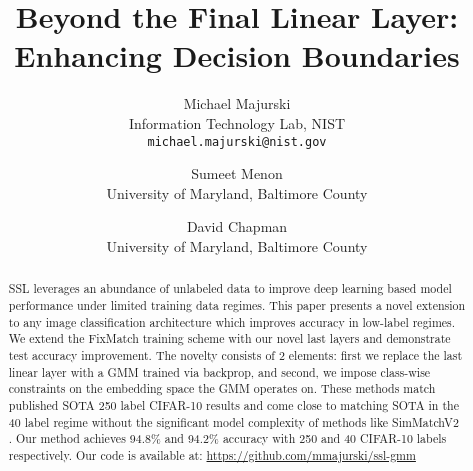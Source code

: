 \documentclass[10pt,twocolumn,letterpaper]{article}
\begin{document}
\title{Beyond the Final Linear Layer: Enhancing Decision Boundaries}

\author{Michael Majurski\\
	Information Technology Lab, NIST\\
	{\tt\small michael.majurski@nist.gov}
\and
Sumeet Menon\\
University of Maryland, Baltimore County\\
\and
David Chapman\\
University of Maryland, Baltimore County\\
}
\maketitle








	
	
\maketitle


\begin{abstract}
SSL leverages an abundance of unlabeled data to improve deep learning based model performance under limited training data regimes.
This paper presents a novel extension to any image classification architecture which improves accuracy in low-label regimes. 
We extend the FixMatch \cite{sohn2020fixmatch} training scheme with our novel last layers and demonstrate test accuracy improvement. 
The novelty consists of 2 elements: first we replace the last linear layer with a GMM trained via backprop, and second, we impose class-wise constraints on the embedding space the GMM operates on.
These methods match published SOTA 250 label CIFAR-10 \cite{cifar10} results and come close to matching SOTA in the 40 label regime without the significant model complexity of methods like SimMatchV2 \cite{zheng2023simmatchv2}.
Our method achieves 94.8\% and 94.2\% accuracy with 250 and 40 CIFAR-10 labels respectively.
Our code is available at: \url{https://github.com/mmajurski/ssl-gmm}  %
\end{abstract}
\end{document}
